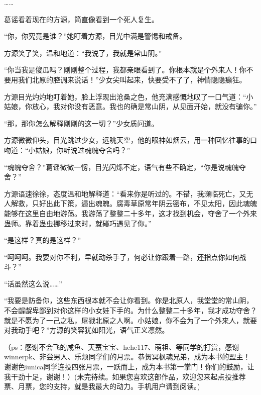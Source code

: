 \begin{this_body}
……

葛谣看着现在的方源，简直像看到一个死人复生。

“你，你究竟是谁？”她盯着方源，目光中满是警惕和戒备。

方源笑了笑，温和地道：“我说了，我就是常山阴。”

“你当我是傻瓜吗？刚刚整个过程，我都亲眼看到了。你根本就是个外来人！你不要用我们北原的腔调来说话！”少女尖叫起来，快要受不了了，神情隐隐癫狂。

方源目光灼灼地盯着她，脸上浮现出沧桑之色，他充满感慨地叹了一口气道：“小姑娘，你放心，我对你没有恶意。我也的确是常山阴，从见面开始，就没有骗你。”

“那，那你怎么解释刚刚的这一切？”少女质问道。

方源微微仰头，目光跳过少女，远眺天空，他的眼神如烟云，用一种回忆往事的口吻道：“小姑娘，你听说过魂魄夺舍吗？”

“魂魄夺舍？”葛谣微微一愣，目光闪烁不定，语气有些不确定，“你是说魂魄夺舍？”

方源语速徐徐，态度温和地解释道：“看来你是听过的。不错，我濒临死亡，又无人解救，只好出此下策，遁出魂魄。腐毒草原常年阴云密布，不见太阳，因此魂魄能够在这里自由地游荡。我游荡了整整二十多年，这才找到机会，夺舍了一个外来蛊师。靠着蛊虫挪移过来时，就碰巧遇见了你。”

“是这样？真的是这样？”

“呵呵呵。我要对你不利，早就动杀手了，何必让你跟着一路，还指点你如何战斗？”

“话虽然这么说……”

“我要是防备你，这些东西根本就不会让你看到。你是北原人，我堂堂的常山阴，不会龌龊卑鄙到对你这样的小女娃下手的。为什么整整二十多年，我才成功夺舍？就是不愿为了一己之私，屠戮北原之人啊。小姑娘，你不会为了一个外来人，就要对我动手吧？”方源的笑容犹如阳光，语气正义凛然。

（ps：感谢不会飞的咸鱼、天蚕宝宝、hehe117、萌祖、等同学的打赏，感谢winnerpk、非尝男人、乐烦同学们的月票。恭贺冥枫魂兄弟，成为本书的盟主！谢谢色iunica同学连投四张月票，一跃而上，成为本书第一掌门！你们的鼓励，让我干劲十足，谢谢！）(未完待续。如果您喜欢这部作品，欢迎您来起点投推荐票、月票，您的支持，就是我最大的动力。手机用户请到阅读。)

\end{this_body}

